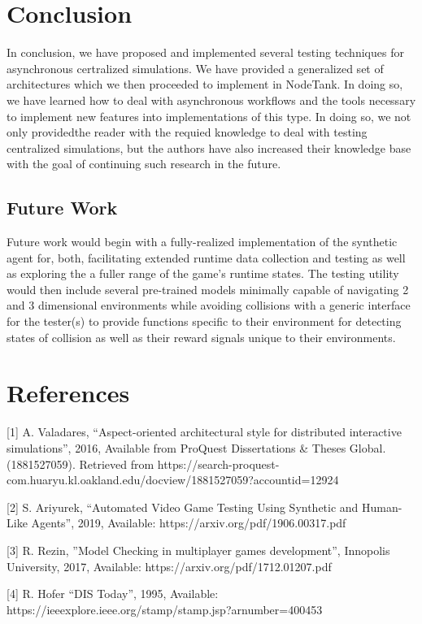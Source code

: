 \documentclass[conference]{IEEEtran}
\begin{document}
\section{Conclusion}

In conclusion, we have proposed and implemented several testing techniques for asynchronous certralized simulations. We have provided a generalized set of architectures which we then proceeded to 
implement in NodeTank. In doing so, we have learned how to deal with asynchronous workflows and the tools necessary to implement new features into implementations of this type. In doing so, we not only providedthe reader with 
the requied knowledge to deal with testing centralized simulations, but the authors have also increased their knowledge base with the goal of continuing such research in the future. 

\subsection{Future Work}
Future work would begin with a fully-realized implementation of the synthetic agent for, both, facilitating extended runtime data collection and testing as well as exploring the a fuller range of the game's runtime states. The testing utility would then include several pre-trained models minimally capable of navigating 2 and 3 dimensional environments while avoiding collisions with a generic interface for the tester(s) to provide functions specific to their environment for detecting states of collision as well as their reward signals unique to their environments.
\section{References}
[1] A. Valadares, “Aspect-oriented architectural style for distributed interactive simulations”, 2016, 
Available from ProQuest Dissertations \& Theses Global. (1881527059). 
Retrieved from https://search-proquest-com.huaryu.kl.oakland.edu/docview/1881527059?accountid=12924

[2] S. Ariyurek, “Automated Video Game Testing Using
Synthetic and Human-Like Agents”, 2019, Available: https://arxiv.org/pdf/1906.00317.pdf
	
[3] R. Rezin, ”Model Checking in multiplayer games development”, Innopolis University, 
2017, Available: https://arxiv.org/pdf/1712.01207.pdf

[4] R. Hofer “DIS Today”, 1995, Available:
https://ieeexplore.ieee.org/stamp/stamp.jsp?arnumber=400453
\end{document}
